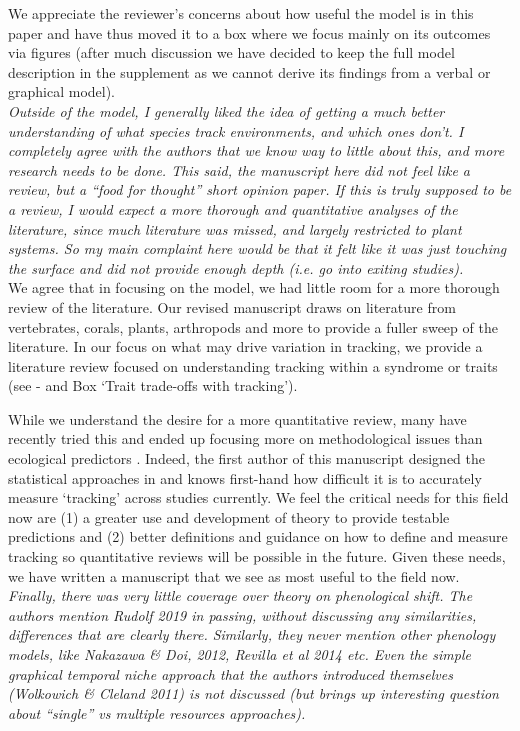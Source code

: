 \documentclass[11pt]{article}
\begin{document}
We appreciate the reviewer's concerns about how useful the model is in this paper and have thus moved it to a box where we focus mainly on its outcomes via figures (after much discussion we have decided to keep the full model description in the supplement as we cannot derive its findings from a verbal or graphical model).\\

\emph{Outside of the model, I generally liked the idea of getting a much better understanding of
what species track environments, and which ones don't. I completely agree with the authors
that we know way to little about this, and more research needs to be done. This said, the
manuscript here did not feel like a review, but a ``food for thought'' short opinion paper. If
this is truly supposed to be a review, I would expect a more thorough and quantitative
analyses of the literature, since much literature was missed, and largely restricted to plant
systems.  So my main complaint here would be that it felt like it was just touching the
surface and did not provide enough depth (i.e. go into exiting studies).}\\

We agree that in focusing on the model, we had little room for a more thorough review of the literature. Our revised manuscript draws on literature from vertebrates, corals, plants, arthropods and more to provide a fuller sweep of the literature. In our focus on what may drive variation in tracking, we provide a literature review focused on understanding tracking within a syndrome or traits (see - and Box `Trait trade-offs with tracking'). 

While we understand the desire for a more quantitative review, many have recently tried this and ended up focusing more on methodological issues than ecological predictors \citep[][]{brown2016,kharouba2018}. Indeed, the first author of this manuscript designed the statistical approaches in \citet{kharouba2018} and knows first-hand how difficult it is to accurately measure `tracking' across studies currently. We feel the critical needs for this field now are (1) a greater use and development of theory to provide testable predictions and (2) better definitions and guidance on how to define and measure tracking so quantitative reviews will be possible in the future. Given these needs, we have written a manuscript that we see as most useful to the field now. \\ 

\emph{Finally, there was very little coverage over theory on phenological shift. The authors
mention Rudolf 2019 in passing, without discussing any similarities, differences that are
clearly there. Similarly, they never mention other phenology models, like Nakazawa \& Doi,
2012, Revilla et al 2014 etc. Even the simple graphical temporal niche approach that the
authors introduced themselves (Wolkowich \& Cleland 2011) is not discussed (but brings up
interesting question about ``single'' vs multiple resources approaches).}\\
\end{document}
